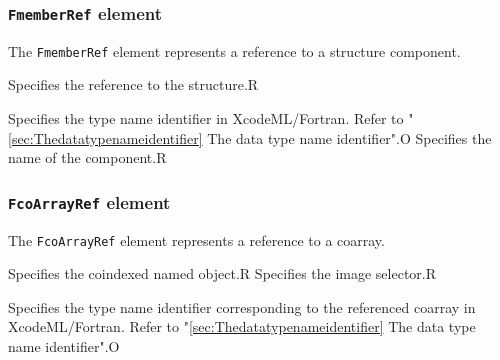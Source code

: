 \subsubsection{ {\tt FmemberRef} element}

The {\tt FmemberRef} element represents a reference to a structure component.


\begin{XcodeMLChildElements}
{Specifies the reference to the structure.}{R}
\end{XcodeMLChildElements}

\begin{XcodeMLAttributes}
{Specifies the type name identifier in XcodeML/Fortran.
 Refer to "\ref{sec:Thedatatypenameidentifier} The data type name identifier".}{O}
{Specifies the name of the component.}{R}
\end{XcodeMLAttributes}


\subsubsection{ {\tt FcoArrayRef} element}

The {\tt FcoArrayRef} element represents a reference to a coarray.


\begin{XcodeMLChildElements}
{Specifies the coindexed named object.}{R}
{Specifies the image selector.}{R}
\end{XcodeMLChildElements}

\begin{XcodeMLAttributes}
{Specifies the type name identifier corresponding to the referenced coarray in XcodeML/Fortran.
 Refer to "\ref{sec:Thedatatypenameidentifier} The data type name identifier".}{O}
\end{XcodeMLAttributes}


